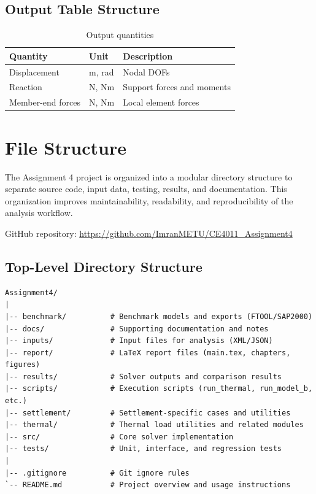 \subsection{Output Table Structure}

\begin{table}[H]
    \centering
    \caption{Output quantities}
    \label{tab:output_quantities}
    \begin{tabular}{lll}
        \toprule
        Quantity & Unit & Description \\
        \midrule
        Displacement & m, rad & Nodal DOFs \\
        Reaction & N, Nm & Support forces and moments \\
        Member-end forces & N, Nm & Local element forces \\
        \bottomrule
    \end{tabular}
\end{table}

\pagebreak
\section{File Structure}

The Assignment 4 project is organized into a modular directory structure to
separate source code, input data, testing, results, and documentation. This
organization improves maintainability, readability, and reproducibility of the
analysis workflow.

GitHub repository: \url{https://github.com/ImranMETU/CE4011_Assignment4}

\subsection{Top-Level Directory Structure}

\begin{verbatim}
Assignment4/
|
|-- benchmark/          # Benchmark models and exports (FTOOL/SAP2000)
|-- docs/               # Supporting documentation and notes
|-- inputs/             # Input files for analysis (XML/JSON)
|-- report/             # LaTeX report files (main.tex, chapters, figures)
|-- results/            # Solver outputs and comparison results
|-- scripts/            # Execution scripts (run_thermal, run_model_b, etc.)
|-- settlement/         # Settlement-specific cases and utilities
|-- thermal/            # Thermal load utilities and related modules
|-- src/                # Core solver implementation
|-- tests/              # Unit, interface, and regression tests
|
|-- .gitignore          # Git ignore rules
`-- README.md           # Project overview and usage instructions
\end{verbatim}

